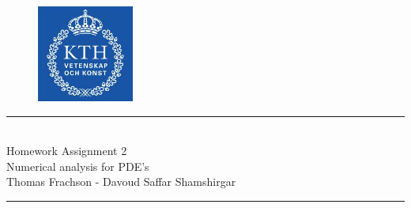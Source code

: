 \documentclass[10pt,a4paper,twoside, french]{article}
\numberwithin{equation}{section}
\numberwithin{figure}{section}
\numberwithin{table}{section}
\begin{document}
\begin{figure}[h]
\centering
\includegraphics[scale=.5]{fig/kth}
\vspace{-1.5cm}
\end{figure}
	\vspace{1cm}    
    \begin{center}
       		\rule{10cm}{1pt} \\[0.6cm]         %
        	{\huge Homework Assignment 2 \\[0.2cm]
         \Large  Numerical analysis for PDE's\\[0.2cm] 
          \large Thomas Frachson - Davoud Saffar Shamshirgar}  \\[0.6cm]
    		\rule{10cm}{1pt} \\[0.5cm]  
	\end{center}    
	
\end{document}
